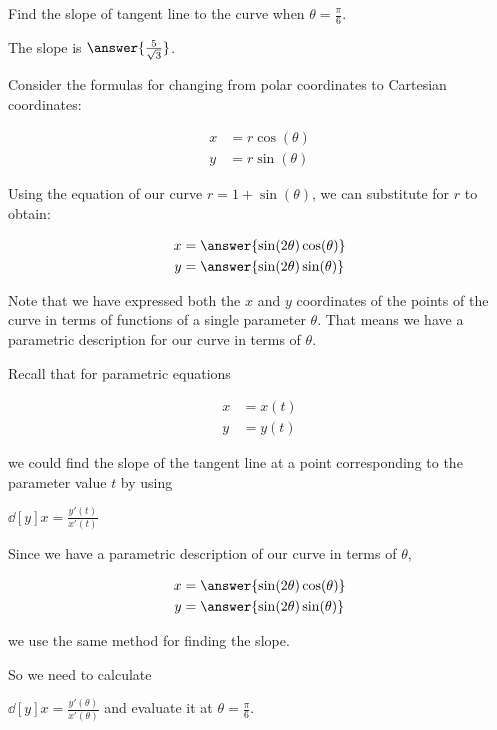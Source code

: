 \documentclass{ximera}
\begin{document}
\begin{exercise}
\begin{hint}
\end{hint}

\begin{exercise}

Find the slope of tangent line to the curve when $\theta=\frac{\pi}{6}$. 

The slope is $\answer{ \frac{5}{\sqrt{3}} }$.

\begin{hint}

Consider the formulas for changing from polar coordinates to Cartesian coordinates:

\begin{align*}
x&=r\cos(\theta) \\
y&=r\sin(\theta)
\end{align*}

Using the equation of our curve $r=1+\sin(\theta)$, we can substitute for $r$ to obtain:

\begin{align*}
x&=\answer{\sin(2\theta)\cos(\theta)} \\
y&=\answer{\sin(2\theta)\sin(\theta) }
\end{align*}

Note that we have expressed both the $x$ and $y$ coordinates of the points of the curve in terms of functions of a single parameter $\theta$. That means we have a parametric description for our curve in terms of $\theta$. 

Recall that for parametric equations 

\begin{align*}
x&=x(t) \\
y&=y(t)
\end{align*}

we could find the slope of the tangent line at a point corresponding to the parameter value $t$ by using 

$\dd[y]{x}=\frac{ y'(t)}{x'(t)}$


Since we have a parametric description of our curve in terms of $\theta$, 

\begin{align*}
x&=\answer{\sin(2\theta)\cos(\theta)} \\
y&=\answer{\sin(2\theta)\sin(\theta) }
\end{align*}

we use the same method for finding the slope. 

So we need to calculate

$\dd[y]{x}=\frac{ y'(\theta)}{x'(\theta)}$ and evaluate it at $\theta=\frac{\pi}{6}$. 


\end{hint}
\end{exercise}
\end{exercise}
\end{document}
